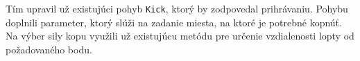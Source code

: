 Tím upravil už existujúci pohyb \texttt{Kick}, ktorý by zodpovedal prihrávaniu. Pohybu doplnili parameter, ktorý slúži na zadanie miesta, na ktoré je potrebné kopnúť. Na výber sily kopu využili už existujúcu metódu pre určenie vzdialenosti lopty od požadovaného bodu.



